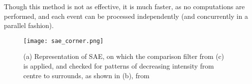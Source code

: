 Though this method is not as effective, it is much faster, as no computations are performed, and each event can be processed independently (and concurrently in a parallel fashion).

\begin{figure}[ht]
    \centering
    \texttt{[image: sae\_corner.png]}
    \caption[Corner detection through SAE]{(a) Representation of SAE, on which the comparison filter from (c) is applied, and checked for patterns of decreasing intensity from centre to surrounds, as shown in (b), from \cite{mueggler2017fast}}
    \label{fig:sec2_sae_corner}
\end{figure}
